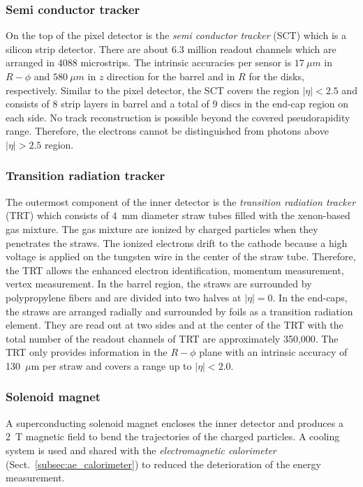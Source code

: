 
\subsubsection{Semi conductor tracker}
\label{subsubsec:ae_sct}
On the top of the pixel detector is the \textit{semi conductor tracker} (SCT) which is a silicon strip detector.
There are about 6.3 million readout channels which are arranged in 4088 microstrips.
The intrinsic accuracies per sensor is $17~\mu m$ in $R-\phi$ and $580~\mu m$ in $z$ direction for the barrel and in $R$ for the  disks, respectively.
Similar to the pixel detector, the SCT covers the region $|\eta| < 2.5$ and consists of 8 strip layers in barrel and a total of 9 discs in the end-cap region on each side.
No track reconstruction is possible beyond the covered pseudorapidity range.
Therefore, the electrons cannot be distinguished from photons above $|\eta| > 2.5$ region.


\subsubsection{Transition radiation tracker}
\label{subsubsec:ae_trt}
The outermost component of the inner detector is the \textit{transition radiation tracker} (TRT) which consists of 4~mm diameter straw tubes filled with the xenon-based gas mixture.
The gas mixture are ionized by charged particles when they penetrates the straws.
The ionized electrons drift to the cathode because a high voltage is applied on the tungsten wire in the center of the straw tube.
Therefore, the TRT allows the enhanced electron identification, momentum measurement, vertex measurement.
In the barrel region, the straws are surrounded by polypropylene fibers and are divided into two halves at $|\eta|=0$.
In the end-caps, the straws are arranged radially and surrounded by foils as a transition radiation element.
They are read out at two sides and at the center of the TRT with the total number of the readout channels of TRT are approximately 350,000.
The TRT only provides information in the $R-\phi$ plane with an intrinsic accuracy of 130~$\mu$m per straw and covers a range up to $|\eta| < 2.0$. 


\subsubsection{Solenoid magnet}
\label{subsubsec:ae_magnetic}
A superconducting solenoid magnet encloses the inner detector and produces a 2~T magnetic field to bend the trajectories of the charged particles.
A cooling system is used and shared with the \textit{electromagnetic calorimeter} (Sect.~\ref{subsec:ae_calorimeter}) to reduced the deterioration of the energy measurement.

